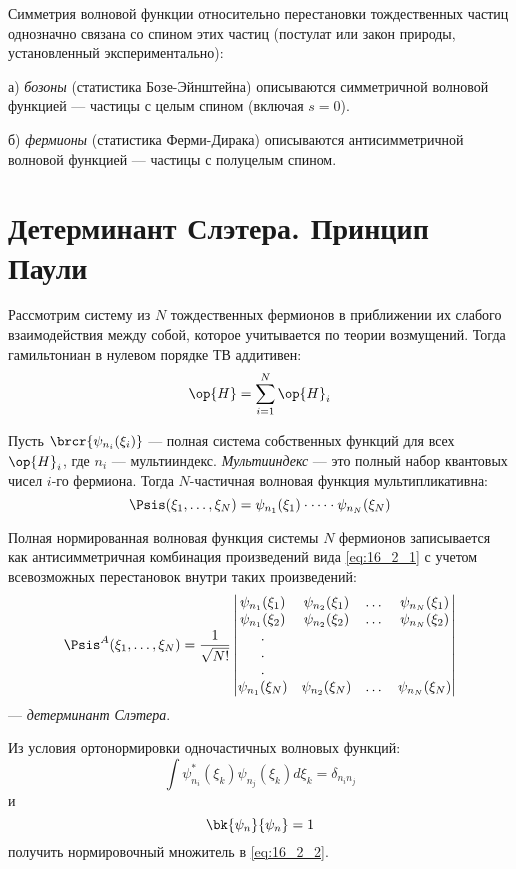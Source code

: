 Симметрия волновой функции относительно перестановки тождественных частиц однозначно связана со спином этих частиц (постулат или закон природы, установленный экспериментально):

а) {\em бозоны} (статистика Бозе-Эйнштейна) описываются симметричной волновой функцией --- частицы с целым спином (включая $s = 0$).

б) {\em фермионы} (статистика Ферми-Дирака) описываются антисимметричной волновой функцией --- частицы с полуцелым спином.

\section{Детерминант Слэтера. Принцип Паули}

Рассмотрим систему из $N$ тождественных фермионов в приближении их слабого взаимодействия между собой, которое учитывается по теории возмущений. Тогда гамильтониан в нулевом порядке ТВ аддитивен:
$$
\op{H} = \sum_{i=1}^N\op{H}_i
$$

Пусть $\brcr{\psi_{n_i}(\xi_i)}$ --- полная система собственных функций для всех $\op{H}_i$, где $n_i$ --- мультииндекс. {\em Мультииндекс} --- это полный набор квантовых чисел $i$-го фермиона. Тогда $N$-частичная волновая функция мультипликативна:
\begin{equation}
\label{eq:16_2_1}
\Psis(\xi_1, \dots, \xi_N) = \psi_{n_1}(\xi_1) \cdot \dots \cdot \psi_{n_N}(\xi_N)
\end{equation}

Полная нормированная волновая функция системы $N$ фермионов записывается как антисимметричная комбинация произведений вида \eqref{eq:16_2_1} с учетом всевозможных перестановок внутри таких произведений:
\begin{equation}
\label{eq:16_2_2}
\Psis^A(\xi_1, \dots, \xi_N) = \frac{1}{\sqrt{N!}} \left |
  \begin{matrix} 
  \psi_{n_1}(\xi_1) & \psi_{n_2}(\xi_1) & \dots &  \psi_{n_N}(\xi_1) \\
  \psi_{n_1}(\xi_2) & \psi_{n_2}(\xi_2) & \dots &  \psi_{n_N}(\xi_2) \\
  .                                &                                  &    &                                    \\
  .                                &                                  &    &                                    \\
  .                                &                                  &    &                                    \\
  \psi_{n_1}(\xi_N) & \psi_{n_2}(\xi_N) & \dots &  \psi_{n_N}(\xi_N)
  \end{matrix} \right |
\end{equation}
--- {\em детерминант Слэтера}.
\begin{excr}

Из условия ортонормировки одночастичных волновых функций: 
$$
\int \psi_{n_i}^*(\xi_k) \psi_{n_j}(\xi_k) d\xi_k = \delta_{n_i n_j}
$$
и 
$$
\bk{\psi_n}{\psi_n} = 1
$$
получить нормировочный множитель в \eqref{eq:16_2_2}.
\end{excr}


